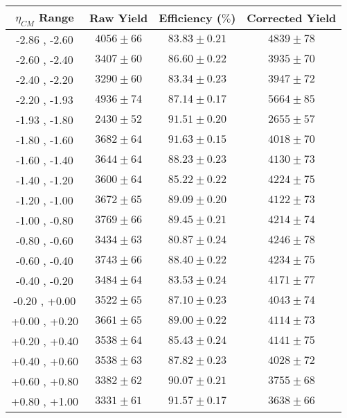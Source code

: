 \begin{table}[!h]
  \centering
  \renewcommand{\arraystretch}{1.5}
  \begin{tabular}{|c|*3c|}
    \hline
    $\eta_{CM}$ Range & Raw Yield & Efficiency ($\%$) & Corrected Yield\\
    \hline\hline
    -2.86 , -2.60 & $4056 \pm 66$ & $83.83 \pm 0.21$ & $4839 \pm 78$\\
    \hline
    -2.60 , -2.40 & $3407 \pm 60$ & $86.60 \pm 0.22$ & $3935 \pm 70$\\
    \hline
    -2.40 , -2.20 & $3290 \pm 60$ & $83.34 \pm 0.23$ & $3947 \pm 72$\\
    \hline
    -2.20 , -1.93 & $4936 \pm 74$ & $87.14 \pm 0.17$ & $5664 \pm 85$\\
    \hline
    -1.93 , -1.80 & $2430 \pm 52$ & $91.51 \pm 0.20$ & $2655 \pm 57$\\
    \hline
    -1.80 , -1.60 & $3682 \pm 64$ & $91.63 \pm 0.15$ & $4018 \pm 70$\\
    \hline
    -1.60 , -1.40 & $3644 \pm 64$ & $88.23 \pm 0.23$ & $4130 \pm 73$\\
    \hline
    -1.40 , -1.20 & $3600 \pm 64$ & $85.22 \pm 0.22$ & $4224 \pm 75$\\
    \hline
    -1.20 , -1.00 & $3672 \pm 65$ & $89.09 \pm 0.20$ & $4122 \pm 73$\\
    \hline
    -1.00 , -0.80 & $3769 \pm 66$ & $89.45 \pm 0.21$ & $4214 \pm 74$\\
    \hline
    -0.80 , -0.60 & $3434 \pm 63$ & $80.87 \pm 0.24$ & $4246 \pm 78$\\
    \hline
    -0.60 , -0.40 & $3743 \pm 66$ & $88.40 \pm 0.22$ & $4234 \pm 75$\\
    \hline
    -0.40 , -0.20 & $3484 \pm 64$ & $83.53 \pm 0.24$ & $4171 \pm 77$\\
    \hline
    -0.20 , +0.00 & $3522 \pm 65$ & $87.10 \pm 0.23$ & $4043 \pm 74$\\
    \hline
    +0.00 , +0.20 & $3661 \pm 65$ & $89.00 \pm 0.22$ & $4114 \pm 73$\\
    \hline
    +0.20 , +0.40 & $3538 \pm 64$ & $85.43 \pm 0.24$ & $4141 \pm 75$\\
    \hline
    +0.40 , +0.60 & $3538 \pm 63$ & $87.82 \pm 0.23$ & $4028 \pm 72$\\
    \hline
    +0.60 , +0.80 & $3382 \pm 62$ & $90.07 \pm 0.21$ & $3755 \pm 68$\\
    \hline
    +0.80 , +1.00 & $3331 \pm 61$ & $91.57 \pm 0.17$ & $3638 \pm 66$\\

\end{tabular}
\end{table}
